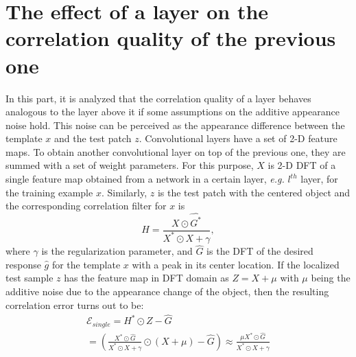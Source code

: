 \documentclass[journal]{IEEEtran}
\begin{document}
\section{The effect of a layer on the correlation quality of the previous one}
\label{Appendix2}
In this part, it is analyzed that the correlation quality of a layer behaves analogous to the layer above it if some assumptions on the additive appearance noise hold. This noise can be perceived as the appearance difference between the template $x$ and the test patch $z$. Convolutional layers have a set of 2-D feature maps. To obtain another convolutional layer on top of the previous one, they are summed with a set of weight parameters. For this purpose, $X$ is 2-D DFT of a single feature map obtained from a network in a certain layer, \emph{e.g.} $l^{th}$ layer, for the training example $x$. Similarly, $z$ is the test patch with the centered object and the corresponding correlation filter for $x$ is
\begin{equation}
\label{App1}
H = \frac{X \odot \hat{G^*}}{X^* \odot X+\gamma},
\end{equation}
where $\gamma$ is the regularization parameter, and $\hat{G}$ is the DFT of the desired response $\hat{g}$ for the template $x$ with a peak in its center location. If the localized test sample $z$ has the feature map in DFT domain as $Z = X+\mu$ with $\mu$ being the additive noise due to the appearance change of the object, then the resulting correlation error turns out to be:
\begin{equation}
\label{App2}
\begin{split}
\mathcal{E}_{single} = H^* \odot Z - \hat{G} \quad \quad \quad\quad  \\
=\left( \frac{X^* \odot \hat{G}}{X^*\odot X+\gamma}\odot (X+\mu)- \hat{G} \right) \approx \frac{\mu X^* \odot \hat{G}}{X^* \odot X + \gamma}
\end{split}
\end{equation}
\end{document}
